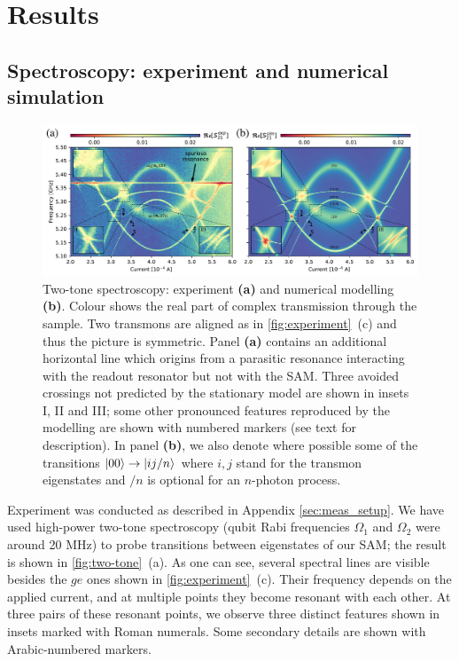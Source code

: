 \documentclass[%
 aip,
 amsmath,amssymb,
 reprint,%
]{revtex4-1}
\begin{document}
\section{Results}

\subsection{\label{sec:level1} Spectroscopy: experiment and numerical simulation}

\begin{figure}
	
	\centering
	\includegraphics[width=\linewidth]{main_picture}
	\caption{Two-tone spectroscopy: experiment \textbf{(a)} and numerical modelling \textbf{(b)}. Colour shows the real part of complex transmission  through the sample. Two transmons are aligned as in \autoref{fig:experiment}~(c) and thus the picture is symmetric. Panel \textbf{(a)} contains an additional horizontal line which origins from a parasitic resonance interacting with the readout resonator but not with the SAM. Three avoided crossings not predicted by the stationary model are shown in insets I, II and III; some other pronounced features reproduced by the modelling are shown with numbered markers (see text for description). In panel \textbf{(b)}, we also denote where possible some of the transitions $\ket{00}\rightarrow \ket{ij/n}$ where $i,j$ stand for the transmon eigenstates and $/n$ is optional for an $n$-photon process.}
	\label{fig:two-tone}
\end{figure}


Experiment was conducted as described in Appendix \ref{sec:meas_setup}. We have used high-power two-tone spectroscopy (qubit Rabi frequencies $\Omega_1$ and $\Omega_2$ were around 20 MHz) to probe transitions between eigenstates of our SAM; the result is shown in \autoref{fig:two-tone}~(a). As one can see, several spectral lines are visible besides the $ge$ ones shown in \autoref{fig:experiment}~(c). Their frequency depends on the applied current, and at multiple points they become resonant with each other. At three pairs of these resonant points, we observe three distinct features shown in insets marked with Roman numerals. Some secondary details are shown with Arabic-numbered markers.
\end{document}
